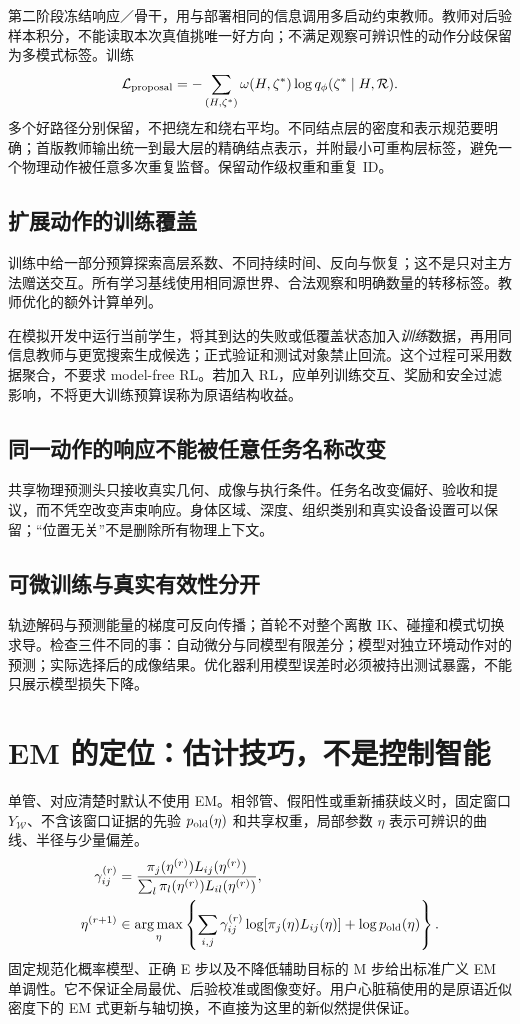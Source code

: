 \documentclass[UTF8,fontset=fandol,11pt,a4paper]{ctexart}
\theoremstyle{plain}
\theoremstyle{definition}
\theoremstyle{remark}
\numberwithin{equation}{section}
\newcommand{\cR}{\mathcal R}
\DeclareMathOperator*{\argmax}{arg\,max}
\begin{document}
第二阶段冻结响应／骨干，用与部署相同的信息调用多启动约束教师。教师对后验样本积分，不能读取本次真值挑唯一好方向；不满足观察可辨识性的动作分歧保留为多模式标签。训练
\begin{equation}
\mathcal L_{\rm proposal}=-\sum_{(H,\zeta^*)}\omega(H,\zeta^*)\log q_\phi(\zeta^*\mid H,\cR).
\end{equation}
多个好路径分别保留，不把绕左和绕右平均。不同结点层的密度和表示规范要明确；首版教师输出统一到最大层的精确结点表示，并附最小可重构层标签，避免一个物理动作被任意多次重复监督。保留动作级权重和重复 ID。

\subsection{扩展动作的训练覆盖}
训练中给一部分预算探索高层系数、不同持续时间、反向与恢复；这不是只对主方法赠送交互。所有学习基线使用相同源世界、合法观察和明确数量的转移标签。教师优化的额外计算单列。

在模拟开发中运行当前学生，将其到达的失败或低覆盖状态加入\emph{训练}数据，再用同信息教师与更宽搜索生成候选；正式验证和测试对象禁止回流。这个过程可采用数据聚合，不要求 model-free RL。若加入 RL，应单列训练交互、奖励和安全过滤影响，不将更大训练预算误称为原语结构收益。

\subsection{同一动作的响应不能被任意任务名称改变}
共享物理预测头只接收真实几何、成像与执行条件。任务名改变偏好、验收和提议，而不凭空改变声束响应。身体区域、深度、组织类别和真实设备设置可以保留；“位置无关”不是删除所有物理上下文。

\subsection{可微训练与真实有效性分开}
轨迹解码与预测能量的梯度可反向传播；首轮不对整个离散 IK、碰撞和模式切换求导。检查三件不同的事：自动微分与同模型有限差分；模型对独立环境动作对的预测；实际选择后的成像结果。优化器利用模型误差时必须被持出测试暴露，不能只展示模型损失下降。

\section{EM 的定位：估计技巧，不是控制智能}
\label{sec:em}
单管、对应清楚时默认不使用 EM。相邻管、假阳性或重新捕获歧义时，固定窗口 $Y_{\mathcal W}$、不含该窗口证据的先验 $p_{\rm old}(\eta)$ 和共享权重，局部参数 $\eta$ 表示可辨识的曲线、半径与少量偏差。
\begin{align}
\gamma_{ij}^{(r)}&=\frac{\pi_j(\eta^{(r)})L_{ij}(\eta^{(r)})}
{\sum_l\pi_l(\eta^{(r)})L_{il}(\eta^{(r)})},\\
\eta^{(r+1)}&\in\argmax_\eta\left\{
\sum_{i,j}\gamma_{ij}^{(r)}\log[\pi_j(\eta)L_{ij}(\eta)]+\log p_{\rm old}(\eta)\right\}.
\end{align}
固定规范化概率模型、正确 E 步以及不降低辅助目标的 M 步给出标准广义 EM 单调性\cite{em}。它不保证全局最优、后验校准或图像变好。用户心脏稿使用的是原语近似密度下的 EM 式更新与轴切换，不直接为这里的新似然提供保证\cite{cardiac}。
\end{document}
